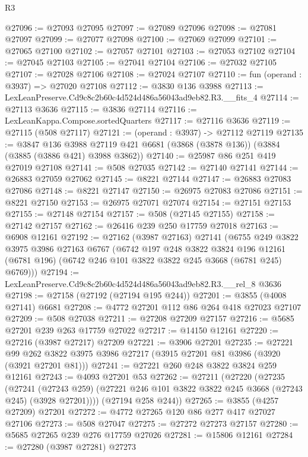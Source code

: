 \begin{lexlean}{R3}
\begin{coremodule}
@27096 := @27093 @27095
@27097 := @27089 @27096
@27098 := @27081 @27097
@27099 := @27077 @27098
@27100 := @27069 @27099
@27101 := @27065 @27100
@27102 := @27057 @27101
@27103 := @27053 @27102
@27104 := @27045 @27103
@27105 := @27041 @27104
@27106 := @27032 @27105
@27107 := @27028 @27106
@27108 := @27024 @27107
@27110 := fun (operand : @3937) => @27020 @27108
@27112 := @3830 @136 @3988
@27113 := LexLeanPreserve.Cd9c8c2b60c4d524d486a56043ad9eb82.R3.__fits_4
@27114 := @27113 @3636
@27115 := @3836 @27114
@27116 := LexLeanKappa.Compose.sortedQuarters
@27117 := @27116 @3636
@27119 := @27115 (@508 @27117)
@27121 := (operand : @3937) -> @27112 @27119
@27135 := @3847
    @136
    @3988
    @27119
    @421
    @6681
    (@3868 (@3878 @136))
    (@3884 (@3885 (@3886 @421) @3988 @3862))
@27140 := @25987 @86 @251 @419 @27019 @27108
@27141 := @508 @27035
@27142 := @27140 @27141
@27144 := @26883 @27059 @27062
@27145 := @8221 @27144
@27147 := @26883 @27083 @27086
@27148 := @8221 @27147
@27150 := @26975 @27083 @27086
@27151 := @8221 @27150
@27153 := @26975 @27071 @27074
@27154 := @27151 @27153
@27155 := @27148 @27154
@27157 := @508 (@27145 @27155)
@27158 := @27142 @27157
@27162 := @26416 @239 @250 @17759 @27018
@27163 := @6908 @12161
@27192 := @27162
    (@3987 @27163)
    @27141
    (@6755
      @249
      @3822
      @3975
      @3986
      @27163
      @6767
      (@6742
        @197
        @248
        @3822
        @3824
        @196
        @12161
        (@6781 @196)
        (@6742 @246 @101 @3822 @3822 @245 @3668 (@6781 @245) @6769)))
@27194 := LexLeanPreserve.Cd9c8c2b60c4d524d486a56043ad9eb82.R3.__rel_8 @3636
@27198 := @27158 (@27192 (@27194 @195 @244))
@27201 := @3855 (@4008 @27141) @6681
@27208 := @4772 @27201 @112 @86 @264 @418 @27023 @27107
@27209 := @508 @27038
@27211 := @27208 @27209 @27157
@27216 := @5685 @27201 @239 @263 @17759 @27022
@27217 := @14150 @12161
@27220 := @27216 (@3987 @27217) @27209
@27221 := @3906 @27201
@27235 := @27221
    @99
    @262
    @3822
    @3975
    @3986
    @27217
    (@3915 @27201 @81 @3986 (@3920 (@3921 @27201 @81)))
@27241 := @27221 @260 @248 @3822 @3824 @259 @12161
@27243 := @4093 @27201 @53
@27262 := @27211
    (@27220
      (@27235
        (@27241
          (@27243 @259)
          (@27221 @246 @101 @3822 @3822 @245 @3668 (@27243 @245) (@3928 @27201))))
      (@27194 @258 @244))
@27265 := @3855 (@4257 @27209) @27201
@27272 := @4772 @27265 @120 @86 @277 @417 @27027 @27106
@27273 := @508 @27047
@27275 := @27272 @27273 @27157
@27280 := @5685 @27265 @239 @276 @17759 @27026
@27281 := @15806 @12161
@27284 := @27280 (@3987 @27281) @27273

\end{coremodule}
\end{lexlean}
